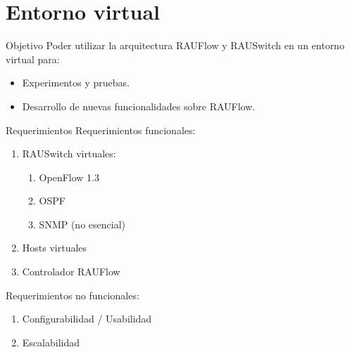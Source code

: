 \documentclass[xcolor=svgnames]{beamer}
\begin{document}
\section{Entorno virtual}

\begin{frame}{}
	\tableofcontents[currentsection]
\end{frame}

\begin{frame}{Objetivo}
	Poder utilizar la arquitectura RAUFlow y RAUSwitch en un entorno virtual para:
	\begin{itemize}
		\item Experimentos y pruebas.
		\item Desarrollo de nuevas funcionalidades sobre RAUFlow.
	\end{itemize}
\end{frame}

\begin{frame}{Requerimientos}
	Requerimientos funcionales:
	\begin{enumerate}
		\item RAUSwitch virtuales:
		\begin{enumerate}
			\item OpenFlow 1.3
			\item OSPF
			\item SNMP (no esencial)
		\end{enumerate}
		\item Hosts virtuales
		\item Controlador RAUFlow
	\end{enumerate}
	\pause
	Requerimientos no funcionales:
	\begin{enumerate}
		\item Configurabilidad / Usabilidad
		\item Escalabilidad
	\end{enumerate}
\end{frame}
\end{document}
